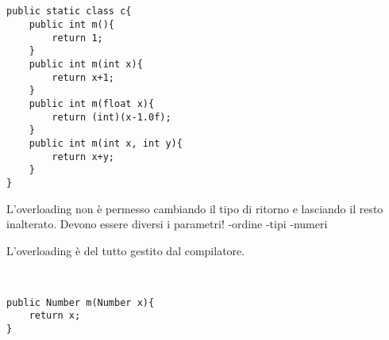 \begin{lstlisting}[basicstyle=\small,]


public static class c{
	public int m(){
		return 1;
	}
	public int m(int x){
		return x+1;
	}
	public int m(float x){
		return (int)(x-1.0f);
	}
	public int m(int x, int y){
		return x+y;
	}		
}

\end{lstlisting}

L'overloading non è permesso cambiando il tipo di ritorno e lasciando il resto inalterato. Devono essere diversi i parametri! \newline
-ordine \newline
-tipi \newline
-numeri \newline

L'overloading è del tutto gestito dal compilatore.

\begin{lstlisting}[basicstyle=\small,]


public Number m(Number x){
	return x;
}

\end{lstlisting}























